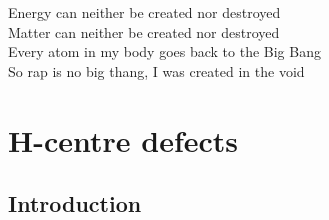 \begin{savequote}[8cm]
Energy can neither be created nor destroyed \\
Matter can neither be created nor destroyed \\
Every atom in my body goes back to the Big Bang \\
So rap is no big thang, I was created in the void
\end{savequote}

\chapter{\label{ch:6-defects}H-centre defects}

\section{Introduction}



